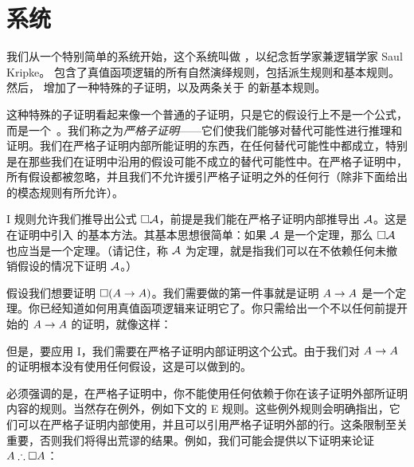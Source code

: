 \section{系统 \mlK}
\label{K}

我们从一个特别简单的系统开始，这个系统叫做 \mlK，以纪念哲学家兼逻辑学家 Saul Kripke。\mlK{} 包含了真值函项逻辑的所有自然演绎规则，包括派生规则和基本规则。然后，\mlK{} 增加了一种特殊的子证明，以及两条关于 \ebox{} 的新基本规则。

这种特殊的子证明看起来像一个普通的子证明，只是它的假设行上不是一个公式，而是一个~\ebox。我们称之为\emph{严格子证明}——它们使我们能够对替代可能性进行推理和证明。我们在严格子证明内部所能证明的东西，在任何替代可能性中都成立，特别是在那些我们在证明中沿用的假设可能不成立的替代可能性中。在严格子证明中，所有假设都被忽略，并且我们不允许援引严格子证明之外的任何行（除非下面给出的模态规则有所允许）。

\ebox I 规则允许我们推导出公式 $\Box \mathcal{A}$，前提是我们能在严格子证明内部推导出 $\mathcal{A}$。这是在证明中引入 \ebox{} 的基本方法。其基本思想很简单：如果 $\mathcal{A}$ 是一个定理，那么 $\Box \mathcal{A}$ 也应当是一个定理。（请记住，称 $\mathcal{A}$ 为定理，就是指我们可以在不依赖任何未撤销假设的情况下证明 $\mathcal{A}$。）

假设我们想要证明 $\Box(A\rightarrow A)$。我们需要做的第一件事就是证明 $A\rightarrow A$ 是一个定理。你已经知道如何用真值函项逻辑来证明它了。你只需给出一个不以任何前提开始的 $A\rightarrow A$ 的证明，就像这样：


\begin{fitchproof}
		\open
		\AS
		\close
\end{fitchproof}


但是，要应用 \ebox I，我们需要在严格子证明内部证明这个公式。由于我们对 $A \rightarrow A$ 的证明根本没有使用任何假设，这是可以做到的。


\begin{fitchproof}
		\open
		\AS
		\open
		\AS
		\close
		\close
\end{fitchproof}

必须强调的是，在严格子证明中，你不能使用任何依赖于你在该子证明外部所证明内容的规则。当然存在例外，例如下文的 \ebox E 规则。这些例外规则会明确指出，它们可以在严格子证明内部使用，并且可以引用严格子证明外部的行。这条限制至关重要，否则我们将得出荒谬的结果。例如，我们可能会提供以下证明来论证 $A\therefore \ebox A$：

